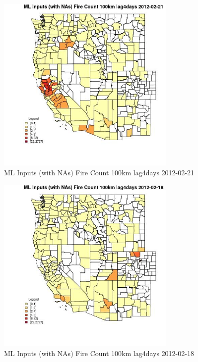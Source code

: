 \begin{figure} 
\centering  
\includegraphics[width=0.77\textwidth]{Code_Outputs/Report_ML_input_PM25_Step4_part_f_de_duplicated_aves_prioritize_24hr_obswNAs_CountyFire_Count_100km_lag4daysMean2012-02-21.jpg} 
\caption{\label{fig:Report_ML_input_PM25_Step4_part_f_de_duplicated_aves_prioritize_24hr_obswNAsCountyFire_Count_100km_lag4daysMean2012-02-21}ML Inputs (with NAs) Fire Count 100km lag4days 2012-02-21} 
\end{figure} 
 

\clearpage 

\begin{figure} 
\centering  
\includegraphics[width=0.77\textwidth]{Code_Outputs/Report_ML_input_PM25_Step4_part_f_de_duplicated_aves_prioritize_24hr_obswNAs_CountyFire_Count_100km_lag4daysMean2012-02-18.jpg} 
\caption{\label{fig:Report_ML_input_PM25_Step4_part_f_de_duplicated_aves_prioritize_24hr_obswNAsCountyFire_Count_100km_lag4daysMean2012-02-18}ML Inputs (with NAs) Fire Count 100km lag4days 2012-02-18} 
\end{figure} 
 

